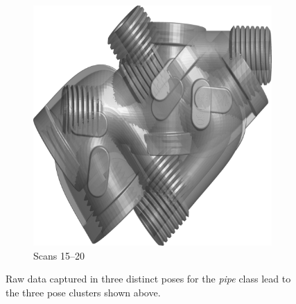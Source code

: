 \begin{figure}[ht]
\begin{subfigure}[b]{0.20\linewidth}
		\includegraphics[width=\linewidth]{fig/3dreg/cluster3.png}
		\caption{Scans 15--20}
	\end{subfigure}
	\caption{Raw data captured in three distinct poses for the \emph{pipe} class lead to the three pose clusters shown above.}
	\label{fig:3dclusters}
\end{figure}

